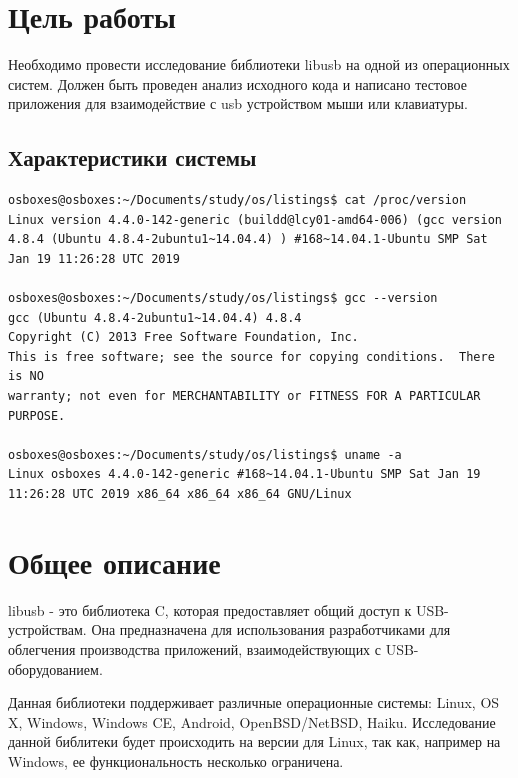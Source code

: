 \documentclass[14pt,a4paper]{article}
\begin{document}





\section{Цель работы}
\par Необходимо провести исследование библиотеки libusb на одной из операционных систем. Должен быть проведен анализ исходного кода и написано тестовое приложения для взаимодействие с usb устройством мыши или клавиатуры.

\subsection{Характеристики системы}
\begin{lstlisting}
osboxes@osboxes:~/Documents/study/os/listings$ cat /proc/version
Linux version 4.4.0-142-generic (buildd@lcy01-amd64-006) (gcc version 4.8.4 (Ubuntu 4.8.4-2ubuntu1~14.04.4) ) #168~14.04.1-Ubuntu SMP Sat Jan 19 11:26:28 UTC 2019

osboxes@osboxes:~/Documents/study/os/listings$ gcc --version
gcc (Ubuntu 4.8.4-2ubuntu1~14.04.4) 4.8.4
Copyright (C) 2013 Free Software Foundation, Inc.
This is free software; see the source for copying conditions.  There is NO
warranty; not even for MERCHANTABILITY or FITNESS FOR A PARTICULAR PURPOSE.

osboxes@osboxes:~/Documents/study/os/listings$ uname -a
Linux osboxes 4.4.0-142-generic #168~14.04.1-Ubuntu SMP Sat Jan 19 11:26:28 UTC 2019 x86_64 x86_64 x86_64 GNU/Linux

\end{lstlisting}

\section{Общее описание}

\par libusb - это библиотека C, которая предоставляет общий доступ к USB-устройствам. Она предназначена для использования разработчиками для облегчения производства приложений, взаимодействующих с USB-оборудованием.\\

\par Данная библиотеки поддерживает различные операционные системы: Linux, OS X, Windows, Windows CE, Android, OpenBSD/NetBSD, Haiku. Исследование данной библитеки будет происходить на версии для Linux, так как, например на Windows, ее функциональность несколько ограничена.\\
\end{document}
